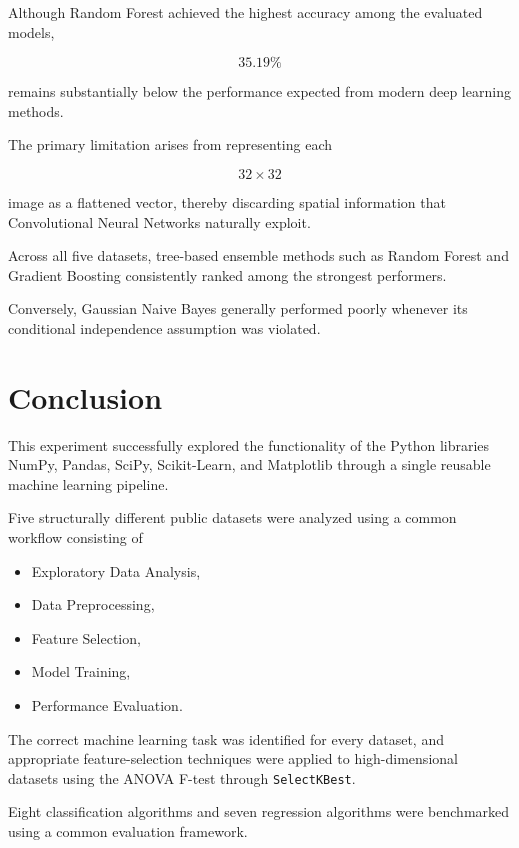 \documentclass[12pt,a4paper]{article}
\begin{document}
Although Random Forest achieved the highest accuracy among the evaluated
models,

\[
35.19\%
\]

remains substantially below the performance expected from modern deep
learning methods.

The primary limitation arises from representing each

\[
32\times32
\]

image as a flattened vector, thereby discarding spatial information that
Convolutional Neural Networks naturally exploit.

Across all five datasets, tree-based ensemble methods such as Random
Forest and Gradient Boosting consistently ranked among the strongest
performers.

Conversely, Gaussian Naive Bayes generally performed poorly whenever its
conditional independence assumption was violated.

\section{Conclusion}

This experiment successfully explored the functionality of the Python
libraries NumPy, Pandas, SciPy, Scikit-Learn, and Matplotlib through a
single reusable machine learning pipeline.

Five structurally different public datasets were analyzed using a common
workflow consisting of

\begin{itemize}
    \item Exploratory Data Analysis,
    \item Data Preprocessing,
    \item Feature Selection,
    \item Model Training,
    \item Performance Evaluation.
\end{itemize}

The correct machine learning task was identified for every dataset, and
appropriate feature-selection techniques were applied to
high-dimensional datasets using the ANOVA F-test through
\texttt{SelectKBest}.

Eight classification algorithms and seven regression algorithms were
benchmarked using a common evaluation framework.
\end{document}
